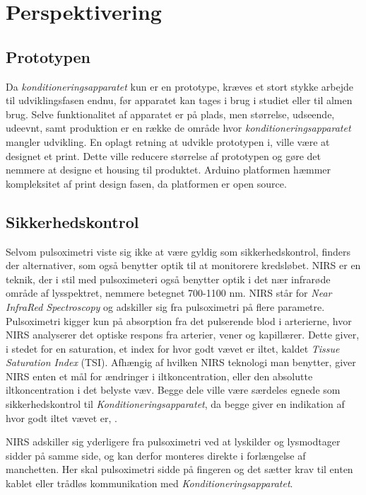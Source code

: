 \chapter{Perspektivering} 

\section{Prototypen}
Da \textit{konditioneringsapparatet} kun er en prototype, kræves et stort stykke arbejde til udviklingsfasen endnu, før apparatet kan tages i brug i studiet eller til almen brug. Selve funktionalitet af apparatet er på plads, men størrelse, udseende, udeevnt, samt produktion er en række de område hvor \textit{konditioneringsapparatet} mangler udvikling. En oplagt retning at udvikle prototypen i, ville være at designet et print. Dette ville reducere størrelse af prototypen og gøre det nemmere at designe et housing til produktet. Arduino platformen hæmmer kompleksitet af print design fasen, da platformen er open source.  

\section{Sikkerhedskontrol}\label{title:nirs}
Selvom pulsoximetri viste sig ikke at være gyldig som sikkerhedskontrol, finders der alternativer, som også benytter optik til at monitorere kredsløbet. NIRS er en teknik, der i stil med pulsoximeteri også benytter optik i det nær infrarøde område af lysspektret, nemmere betegnet 700-1100 nm. NIRS står for \textit{Near InfraRed Spectroscopy} og adskiller sig fra pulsoximetri på flere parametre. Pulsoximetri kigger kun på absorption fra det pulserende blod i arterierne, hvor NIRS analyserer det optiske respons fra arterier, vener og kapillærer. Dette giver, i stedet for en saturation, et index for hvor godt vævet er iltet, kaldet \textit{Tissue Saturation Index} (TSI). Afhængig af hvilken NIRS teknologi man benytter, giver NIRS enten et mål for ændringer i iltkoncentration, eller den absolutte iltkoncentration i det belyste væv. Begge dele ville være særdeles egnede som sikkerhedskontrol til \textit{Konditioneringsapparatet}, da begge giver en indikation af hvor godt iltet vævet er, \cite{RefWorks:22} .

NIRS adskiller sig yderligere fra pulsoximetri ved at lyskilder og lysmodtager sidder på samme side, og kan derfor monteres direkte i forlængelse af manchetten. Her skal pulsoximetri sidde på fingeren og det sætter krav til enten kablet eller trådløs kommunikation med \textit{Konditioneringsapparatet}. 

